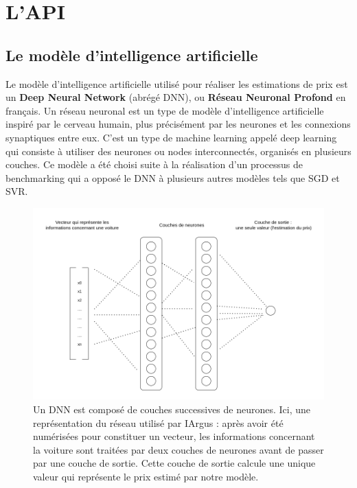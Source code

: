 \documentclass[french]{article}
\begin{document}
    \section{L'API}
    \subsection{Le modèle d'intelligence artificielle}
    Le modèle d'intelligence artificielle utilisé pour réaliser les estimations de prix est un \textbf{Deep Neural Network} (abrégé DNN), ou \textbf{Réseau Neuronal Profond} en français. Un réseau neuronal est un type de modèle d'intelligence artificielle inspiré par le cerveau humain, plus précisément par les neurones et les connexions synaptiques entre eux. C'est un type de machine learning appelé deep learning qui consiste à utiliser des neurones ou nodes interconnectés, organisés en plusieurs couches. Ce modèle a été choisi suite à la réalisation d'un processus de benchmarking qui a opposé le DNN à plusieurs autres modèles tels que SGD et SVR.

    
    \begin{figure}[h!]
        \includegraphics[width=12cm]{dnn}
        \centering
        \caption{Un DNN est composé de couches successives de neurones. Ici, une représentation du réseau utilisé par IArgus : après avoir été numérisées pour constituer un vecteur, les informations concernant la voiture sont traitées par deux couches de neurones avant de passer par une couche de sortie. Cette couche de sortie calcule une unique valeur qui représente le prix estimé par notre modèle.}
    \end{figure}
\end{document}
